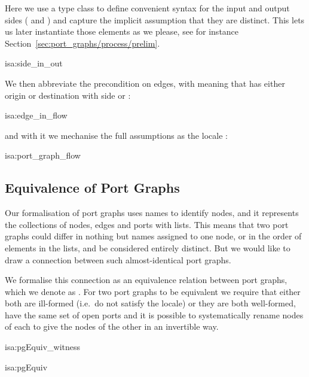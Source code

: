\documentclass[class=smolathesis,crop=false]{standalone}
\begin{document}
Here we use a type class to define convenient syntax for the input and output sides ( and ) and capture the implicit assumption that they are distinct.
This lets us later instantiate those elements as we please, see for instance Section~\ref{sec:port_graphs/process/prelim}.
\begin{isadef}{isa:side_in_out}
  
\end{isadef}

We then abbreviate the precondition on edges, with  meaning that  has either origin or destination with side  or :
\begin{isadef}{isa:edge_in_flow}
  
\end{isadef}
\noindent
and with it we mechanise the full assumptions as the locale :
\begin{isadef}{isa:port_graph_flow}
  
\end{isadef}

\subsection{Equivalence of Port Graphs}
\label{sec:port_graphs/mech/equiv}

Our formalisation of port graphs uses names to identify nodes, and it represents the collections of nodes, edges and ports with lists.
This means that two port graphs could differ in nothing but names assigned to one node, or in the order of elements in the lists, and be considered entirely distinct.
But we would like to draw a connection between such almost-identical port graphs.

We formalise this connection as an equivalence relation between port graphs, which we denote as \isa{\isasymapprox}.
For two port graphs to be equivalent we require that either both are ill-formed (i.e.\ do not satisfy the  locale) or they are both well-formed, have the same set of open ports and it is possible to systematically rename nodes of each to give the nodes of the other in an invertible way.

\begin{isadef}{isa:pgEquiv_witness}
  
\end{isadef}
\begin{isadef}{isa:pgEquiv}
  
\end{isadef}
\end{document}
